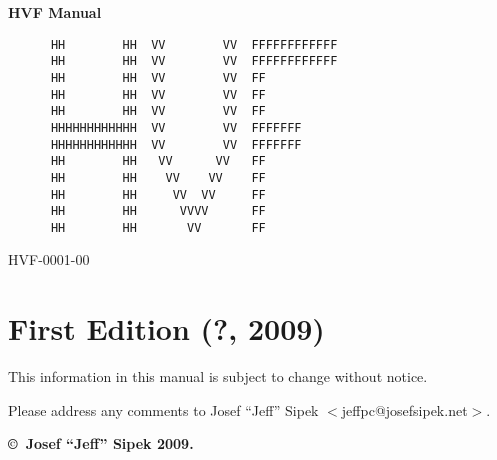 \begin{titlepage}
\vspace*{0.5in}
\Huge \textbf{HVF Manual}
\normalsize
\vspace{1.4in}
\Large
\begin{verbatim}
      HH        HH  VV        VV  FFFFFFFFFFFF
      HH        HH  VV        VV  FFFFFFFFFFFF
      HH        HH  VV        VV  FF
      HH        HH  VV        VV  FF
      HH        HH  VV        VV  FF
      HHHHHHHHHHHH  VV        VV  FFFFFFF
      HHHHHHHHHHHH  VV        VV  FFFFFFF
      HH        HH   VV      VV   FF
      HH        HH    VV    VV    FF
      HH        HH     VV  VV     FF
      HH        HH      VVVV      FF
      HH        HH       VV       FF
\end{verbatim}
\normalsize
{}
\hfill HVF-0001-00
\newpage
{}
\section*{First Edition (?, 2009)}
This information in this manual is subject to change without notice.

Please address any comments to Josef ``Jeff'' Sipek
$<$jeffpc@josefsipek.net$>$.

\textbf{\copyright\ Josef ``Jeff'' Sipek 2009.}
\end{titlepage}
